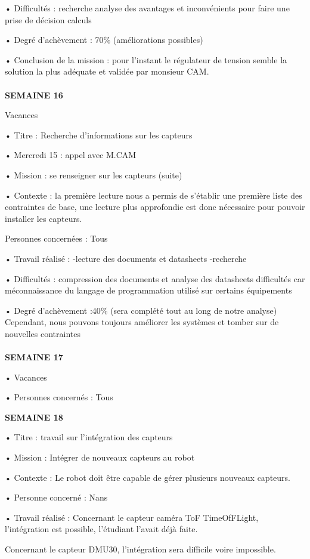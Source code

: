 \documentclass{PackagerQualityN}
\begin{document}
• Difficultés : 
recherche
analyse des avantages et inconvénients pour faire une prise de décision
calculs

• Degré d’achèvement : 70\% (améliorations possibles)
 
• Conclusion de la mission : pour l’instant le régulateur de tension semble la solution la plus adéquate et validée par monsieur CAM.
\\\\
\textbf{SEMAINE 16}

Vacances

• Titre : Recherche d’informations sur les capteurs

• Mercredi 15 : appel avec M.CAM

• Mission : se renseigner sur les capteurs (suite)

• Contexte : la première lecture nous a permis de s’établir une première liste des contraintes de base, une lecture plus approfondie est donc nécessaire pour pouvoir installer les capteurs.

Personnes concernées : Tous

• Travail réalisé :
-lecture des documents et datasheets
-recherche

• Difficultés :
compression des documents et analyse des datasheets
difficultés car méconnaissance du langage de programmation utilisé sur certains équipements

• Degré d’achèvement :40\% (sera complété tout au long de notre analyse)
Cependant, nous pouvons toujours améliorer les systèmes et tomber sur de nouvelles contraintes
\\\\
\newp
\textbf{SEMAINE 17}

• Vacances

• Personnes concernés : Tous

\textbf{SEMAINE 18} 

• Titre : travail sur l’intégration des capteurs

• Mission : Intégrer de nouveaux capteurs au robot

• Contexte : Le robot doit être capable de gérer plusieurs nouveaux capteurs.

• Personne concerné : Nans

• Travail réalisé :
Concernant le capteur caméra ToF TimeOfFLight, l’intégration est possible, l’étudiant l’avait déjà faite.


Concernant le capteur DMU30, l’intégration sera difficile voire impossible. 
\end{document}
